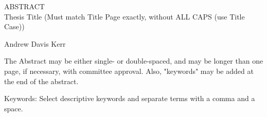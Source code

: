 \begin{center}
ABSTRACT \\
Thesis Title (Must match Title Page exactly, without ALL CAPS (use Title Case))

Andrew Davis Kerr
\end{center}

The Abstract may be either single- or double-spaced, and may be longer than one page, if necessary, with committee approval. Also, "keywords" may be added at the end of the abstract.

Keywords: Select descriptive keywords and separate terms with a comma and a space.
\clearpage